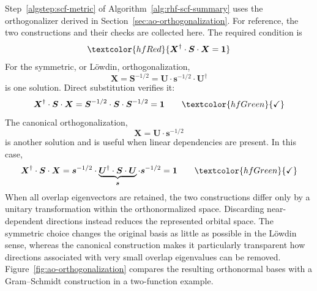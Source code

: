 \documentclass[11pt,a4paper,titlepage]{article}
\numberwithin{equation}{section}
\newcommand{\bs}{\boldsymbol{s}}
\newcommand{\bI}{\boldsymbol{1}}
\newcommand{\bS}{\boldsymbol{S}}
\newcommand{\bU}{\boldsymbol{U}}
\newcommand{\bX}{\boldsymbol{X}}
\newcommand{\red}[1]{\textcolor{hfRed}{#1}}
\newcommand{\green}[1]{\textcolor{hfGreen}{#1}}
\begin{document}
Step~\ref{algstep:scf-metric} of Algorithm~\ref{alg:rhf-scf-summary} uses
the orthogonalizer derived in Section~\ref{sec:ao-orthogonalization}.
For reference, the two constructions and their checks are collected here.
The required condition is
\begin{equation}
  \red{\bX^\dag\cdot\bS\cdot\bX=\bI}
\end{equation}
For the symmetric, or \red{L\"owdin}, orthogonalization,
\begin{equation}
  \bX=\bS^{-1/2}
  =\bU\cdot\bs^{-1/2}\cdot\bU^\dag
\end{equation}
is one solution. Direct substitution verifies it:
\begin{equation}
  \bX^\dag\cdot\bS\cdot\bX
  =\bS^{-1/2}\cdot\bS\cdot\bS^{-1/2}
  =\bI
  \qquad\green{\checkmark}
\end{equation}
The canonical orthogonalization,
\begin{equation}
  \bX=\bU\cdot\bs^{-1/2}
\end{equation}
is another solution and is useful when linear dependencies are present. In
this case,
\begin{equation}
  \bX^\dag\cdot\bS\cdot\bX
  =\bs^{-1/2}\cdot
   \underbrace{\bU^\dag\cdot\bS\cdot\bU}_{\bs}
   \cdot\bs^{-1/2}
  =\bI
  \qquad\green{\checkmark}
\end{equation}
When all overlap eigenvectors are retained, the two constructions differ
only by a unitary transformation within the orthonormalized space. Discarding
near-dependent directions instead reduces the represented orbital space.
The symmetric choice changes the original basis as
little as possible in the L\"owdin sense, whereas the canonical construction
makes it particularly transparent how directions associated with very small
overlap eigenvalues can be removed.
Figure~\ref{fig:ao-orthogonalization} compares the resulting orthonormal bases
with a Gram--Schmidt construction in a two-function example.
\end{document}

